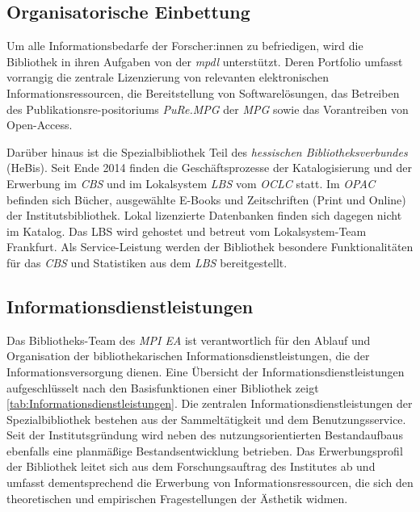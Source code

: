 \subsection{Organisatorische Einbettung}
Um alle Informationsbedarfe der Forscher:innen zu befriedigen, wird die Bibliothek in ihren Aufgaben von der
\textit{\acrfull{mpdl}} unterstützt. Deren Portfolio umfasst vorrangig die zentrale 
Lizenzierung von relevanten elektronischen Informationsressourcen, die Bereitstellung von Softwarelösungen, 
das Betreiben des Publikationsre-positoriums \textit{\acrshort{PuRe.MPG}} der \textit{\acrfull{MPG}} sowie
das Vorantreiben von Open-Access. 

Darüber hinaus ist die Spezialbibliothek Teil des \textit{hessischen Bibliotheksverbundes} (\acrshort{HeBis}). 
Seit Ende 2014 finden die Geschäftsprozesse der Katalogisierung und der Erwerbung im \textit{\acrfull{CBS}} und 
im Lokalsystem \textit{\acrfull{LBS}} vom \textit{\acrfull{OCLC}} statt. Im \textit{\acrfull{OPAC}} befinden sich Bücher, ausgewählte E-Books 
und Zeitschriften (Print und Online) der Institutsbibliothek. Lokal lizenzierte Datenbanken finden sich dagegen
nicht im Katalog. Das \acrshort{LBS} wird gehostet und betreut 
vom Lokalsystem-Team Frankfurt. Als Service-Leistung werden der Bibliothek besondere Funktionalitäten 
für das \textit{\acrlong{CBS}} und Statistiken aus dem \textit{\acrshort{LBS}} bereitgestellt.


\subsection{Informationsdienstleistungen}
Das Bibliotheks-Team des \textit{\acrshort{MPI EA}} ist verantwortlich für den Ablauf und Organisation der bibliothekarischen 
Informationsdienstleistungen, die der Informationsversorgung dienen. Eine Übersicht der Informationsdienstleistungen 
aufgeschlüsselt nach den Basisfunktionen einer Bibliothek\cite[S. 204 f.]{rosch_bibliotheken_2019} zeigt \autoref{tab:Informationsdienstleistungen}. 
Die zentralen Informationsdienstleistungen der Spezialbibliothek bestehen aus der Sammeltätigkeit und dem Benutzungsservice.
Seit der Institutsgründung wird neben des nutzungsorientierten Bestandaufbaus ebenfalls eine planmäßige 
Bestandsentwicklung betrieben. Das Erwerbungsprofil der Bibliothek leitet sich aus dem Forschungsauftrag des Institutes 
ab und umfasst dementsprechend die Erwerbung von Informationsressourcen, die sich den theoretischen und 
empirischen Fragestellungen der Ästhetik widmen.



